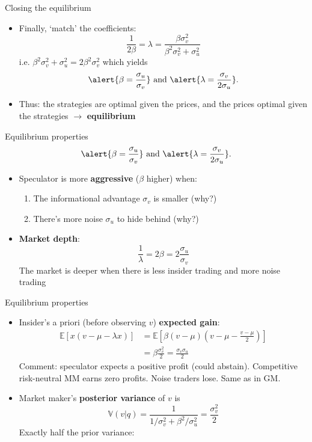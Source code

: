 \documentclass[english,10pt
,aspectratio=169
]{beamer}
\begin{document}
\begin{frame}{Closing the equilibrium}
	\begin{itemize}
		\item Finally, `match' the coefficients:
		\[
			\frac{1}{2\beta}=\lambda = \frac{\beta \sigma^2_v}{\beta^2 \sigma^2_v + \sigma^2_u}
		\]
		i.e. $\beta^2 \sigma^2_v + \sigma^2_u = 2 \beta^2 \sigma^2_v$ which yields
		\[
				\alert{ \beta = \frac{\sigma_u}{\sigma_v}}\text{ and } \alert{ \lambda = \frac{\sigma_v}{2\sigma_u}}.
		\]
		\item Thus: the strategies are optimal given the prices, and the prices optimal given the strategies $\rightarrow $ \textbf{equilibrium}
	\end{itemize}
\end{frame}


\begin{frame}{Equilibrium properties}
	\[
		\alert{ \beta = \frac{\sigma_u}{\sigma_v}}\text{ and } \alert{ \lambda = \frac{\sigma_v}{2\sigma_u}}.
	\]
	\begin{itemize}
		\item Speculator is more \textbf{aggressive} ($\beta$ higher) when:
		\begin{enumerate}
			\item The informational advantage $\sigma_v$ is smaller (why?)
			\item There's more noise $\sigma_u$ to hide behind (why?)
		\end{enumerate}
		\pause
		\item \textbf{Market depth}:
		\[
			\frac{1}{\lambda} = 2\beta = 2 \frac{\sigma_u}{\sigma_v}
		\]
		The market is deeper when there is less insider trading and more noise trading
	\end{itemize}
\end{frame}


\begin{frame}{Equilibrium properties}
	\begin{itemize}
		\item Insider's a priori (before observing $v$) \textbf{expected gain}:
		\begin{align*}
		\mathbb{E}[x(v-\mu-\lambda x)] 
		& =\mathbb{E} \left[ \beta(v-\mu)\left(v-\mu-\frac{v-\mu}{2}\right) \right] \\
		&=\beta\frac{ \sigma^2_v}{2}=\frac{\sigma_v \sigma_u}{2}
		\end{align*}
		Comment: speculator expects a positive profit (could abstain). Competitive risk-neutral MM earns zero profits. Noise traders lose. Same as in GM.
		\pause
		\item Market maker's \textbf{posterior variance} of $v$ is
		\[
		\mathbb{V}(v|q) = \frac{1}{1/\sigma^2_v + \beta^2/\sigma^2_u} = \frac{\sigma^2_v}{2}
		\]
		Exactly half the prior variance: 
	\end{itemize}
\end{frame}
\end{document}
